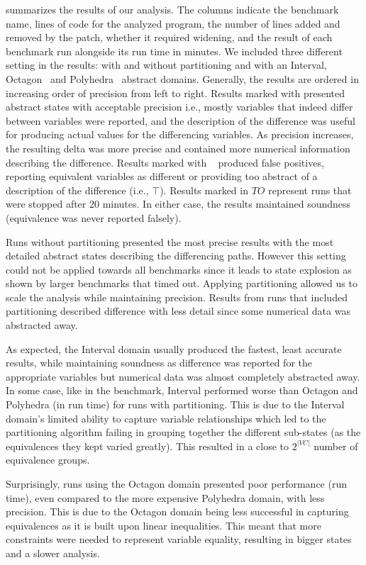  summarizes the results of our analysis. The columns indicate the benchmark name, lines of code for the analyzed program, the number of lines added and removed by the patch, whether it required widening, and the result of each benchmark run alongside its run time in minutes. We included three different setting in the results: with and without partitioning and with an Interval, Octagon~\cite{Mine2006} and Polyhedra~\cite{CousotHalbwachs78} abstract domains. Generally, the results are ordered in increasing order of precision from left to right. Results marked with \checkmark presented abstract states with acceptable precision i.e., mostly variables that indeed differ between variables were reported, and the description of the difference was useful for producing actual values for the differencing variables. As precision increases, the resulting delta was more precise and contained more numerical information describing the difference. Results marked with \xmark~ produced false positives, reporting equivalent variables as different or providing too abstract of a description of the difference (i.e., $\top$). Results marked in $TO$ represent runs that were stopped after 20 minutes. In either case, the results maintained soundness (equivalence was never reported falsely).

Runs without partitioning presented the most precise results with the most detailed abstract states describing the differencing paths. However this setting could not be applied towards all benchmarks since it leads to state explosion as shown by larger benchmarks that timed out. Applying partitioning allowed us to scale the analysis while maintaining precision. Results from runs that included partitioning described difference with less detail since some numerical data was abstracted away.

As expected, the Interval domain usually produced the fastest, least accurate results, while maintaining soundness as difference was reported for the appropriate variables but numerical data was almost completely abstracted away. In some case, like in the  benchmark, Interval performed worse than Octagon and Polyhedra (in run time) for runs with partitioning. This is due to the Interval domain's limited ability to capture variable relationships which led to the partitioning algorithm failing in grouping together the different sub-states (as the equivalences they kept varied greatly). This resulted in a close to $2^{|VC|}$ number of equivalence groups.

Surprisingly, runs using the Octagon domain presented poor performance (run time), even compared to the more expensive Polyhedra domain, with less precision. This is due to the Octagon domain being less successful in capturing equivalences as it is built upon linear inequalities. This meant that more constraints were needed to represent variable equality, resulting in bigger states and a slower analysis.

